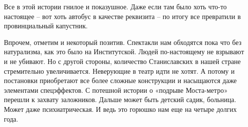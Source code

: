 Все в этой истории гнилое и показушное. Даже если там было хоть что-то
настоящее – вот хоть автобус в качестве реквизита – по итогу все превратили в
провинциальный капустник.

Впрочем, отметим и некоторый позитив. Спектакли нам обходятся пока что без
натурализма, как это было на Институтской. Людей по-настоящему не взрывают и не
убивают. Но с другой стороны, количество Станиславских в нашей стране
стремительно увеличивается. Неверующие в театр идти не хотят. А потому и
постановки приобретают все более сложные конструкции и насыщаются даже
элементами спецэффектов. С потешной истории о «подрыве Моста-метро» перешли к
захвату заложников. Дальше может быть детский садик, больница. Может даже
психиатрическая. И ведь это горюшко нам еще на четыре долгих года.
